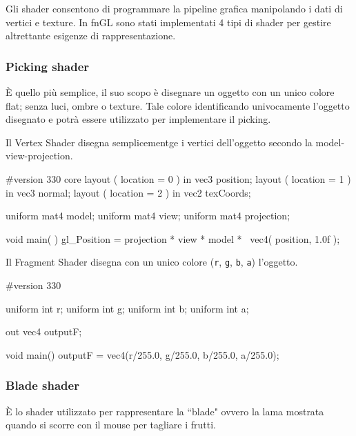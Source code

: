 Gli shader consentono di programmare la pipeline grafica manipolando i dati di vertici e texture. In fnGL sono stati implementati 4 tipi di shader per gestire altrettante esigenze di rappresentazione. 


\subsubsection{Picking shader}
È quello più semplice, il suo scopo è disegnare un oggetto con un unico colore flat; senza luci, ombre o texture. Tale colore identificando univocamente l'oggetto disegnato e potrà essere utilizzato per implementare il picking. 

Il Vertex Shader disegna semplicementge i vertici dell'oggetto secondo la model-view-projection.
\begin{cpp}[caption={Codice sorgente del Vertex Shader. Applica la trasformazione a tutti i vertici del modello.}, captionpos=t]
 #version 330 core
 layout ( location = 0 ) in vec3 position;
 layout ( location = 1 ) in vec3 normal;
 layout ( location = 2 ) in vec2 texCoords;

 uniform mat4 model;
 uniform mat4 view;
 uniform mat4 projection;
 
 void main( )
 {
     gl_Position = projection * view * model * \
 	               vec4( position, 1.0f );
 }
\end{cpp}

Il Fragment Shader disegna con un unico colore (\texttt{r}, \texttt{g}, \texttt{b}, \texttt{a}) l'oggetto.
\begin{cpp}[caption={Codice sorgente del Fragment Shader.}, captionpos=t]
 #version 330
 
 uniform int r;
 uniform int g;
 uniform int b;
 uniform int a;
 
 out vec4 outputF;
 
 void main()
 {
     outputF = vec4(r/255.0, g/255.0, b/255.0, a/255.0);
 }
\end{cpp}




\subsubsection{Blade shader}
È lo shader utilizzato per rappresentare la ``blade" ovvero la lama mostrata quando si scorre con il mouse per tagliare i frutti. 

